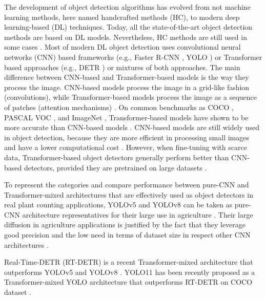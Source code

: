 \documentclass{article}
\begin{document}
The development of object detection algorithms has evolved from not machine learning methods, 
here named handcrafted methods (HC), to modern deep learning-based (DL) techniques.
Today, all the state-of-the-art object detection methods are based on DL models. 
Nevertheless, HC methods are still used in some cases 
\cite{davidPlantDetectionCounting2021,garcia-martinezDigitalCountCorn2020}. 
Most of modern DL object detection uses convolutional neural networks (CNN) \cite{lecunDeepLearning2015} based 
frameworks (e.g., Faster R-CNN \cite{FasterRCNNRealTime}, YOLO \cite{YouOnlyLook}) 
or Transformer \cite{vaswaniAttentionAllYou2017} based approaches (e.g., DETR \cite{carionEndtoEndObjectDetection2020})
or mixtures of both approaches.
The main difference between CNN-based and Transformer-based models is the way they
process the image. CNN-based models process the image in a grid-like fashion (convolutions),
while Transformer-based models process the image as a sequence of patches (attention mechanisms) \cite{dosovitskiyImageWorth16x162021}.
On common benchmarks as COCO \cite{linMicrosoftCOCOCommon2015}, PASCAL VOC \cite{jingSelfsupervisedVisualFeature2019}, 
and ImageNet \cite{14090575ImageNetLarge}, Transformer-based models have shown 
to be more accurate than CNN-based models \cite{zongDETRsCollaborativeHybrid2023}.
CNN-based models are still widely used in object detection, because they are
more efficient in processing small images and have a lower computational cost \cite{khanSurveyVisionTransformers2023}.
However, when fine-tuning with scarce data, Transformer-based object detectors generally 
perform better than CNN-based detectors, provided they are pretrained on large datasets \cite{rekavandiTransformersSmallObject2023,liTransformerObjectDetection2023,amjoudObjectDetectionUsing2023}.

To represent the categories and compare performance between pure-CNN and Transformer-mixed architectures
that are effectively used as object detectors in real plant counting applications,
YOLOv5 and YOLOv8 can be taken as pure-CNN architecture representatives for their 
large use in agriculture \cite{badgujarAgriculturalObjectDetection2024}.
Their large diffusion in agriculture applications is justified by the fact that they leverage good precision
and the low need in terms of dataset size in respect other CNN architectures \cite{tanEfficientDetScalableEfficient2020,linFocalLossDense2018,zhangComparisonYOLObasedSorghum2025}.

Real-Time-DETR (RT-DETR) is a recent Transformer-mixed architecture that outperforms
YOLOv5 and YOLOv8 \cite{zhaoDETRsBeatYOLOs2024}. 
YOLO11 has been recently proposed as a
Transformer-mixed YOLO architecture that outperforms RT-DETR on COCO dataset \cite{khanamYOLOv11OverviewKey2024}.
\end{document}
